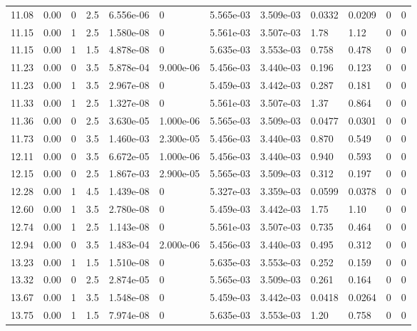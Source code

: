 \documentclass[preview]{standalone}
\begin{document}
{{{\begin{tabular}{L{1.2cm}C{1.2cm} C{0.3cm}C{0.5cm} C{1.4cm}C{1.4cm} C{1.4cm}C{1.4cm} C{1.6cm}C{1.6cm} C{1.6cm}C{1.6cm}}
  11.08  &  0.00  & 0     & 2.5 &  6.556e-06  & 0  &  5.565e-03&   3.509e-03& 0.0332 & 0.0209   &  0 & 0  \\ 
  11.15  &  0.00  & 1     & 2.5 &  1.580e-08  & 0  &  5.561e-03&   3.507e-03& 1.78 & 1.12   &  0 & 0  \\ 
  11.15  &  0.00  & 1     & 1.5 &  4.878e-08  & 0  &  5.635e-03&   3.553e-03& 0.758 & 0.478   &  0 & 0  \\ 
  11.23  &  0.00  & 0     & 3.5 &  5.878e-04  & 9.000e-06  &  5.456e-03&   3.440e-03& 0.196 & 0.123   &  0 & 0  \\ 
  11.23  &  0.00  & 1     & 3.5 &  2.967e-08  & 0  &  5.459e-03&   3.442e-03& 0.287 & 0.181   &  0 & 0  \\ 
  11.33  &  0.00  & 1     & 2.5 &  1.327e-08  & 0  &  5.561e-03&   3.507e-03& 1.37 & 0.864   &  0 & 0  \\ 
  11.36  &  0.00  & 0     & 2.5 &  3.630e-05  & 1.000e-06  &  5.565e-03&   3.509e-03& 0.0477 & 0.0301   &  0 & 0  \\ 
  11.73  &  0.00  & 0     & 3.5 &  1.460e-03  & 2.300e-05  &  5.456e-03&   3.440e-03& 0.870 & 0.549   &  0 & 0  \\ 
  12.11  &  0.00  & 0     & 3.5 &  6.672e-05  & 1.000e-06  &  5.456e-03&   3.440e-03& 0.940 & 0.593   &  0 & 0  \\ 
  12.15  &  0.00  & 0     & 2.5 &  1.867e-03  & 2.900e-05  &  5.565e-03&   3.509e-03& 0.312 & 0.197   &  0 & 0  \\ 
  12.28  &  0.00  & 1     & 4.5 &  1.439e-08  & 0  &  5.327e-03&   3.359e-03& 0.0599 & 0.0378   &  0 & 0  \\ 
  12.60  &  0.00  & 1     & 3.5 &  2.780e-08  & 0  &  5.459e-03&   3.442e-03& 1.75 & 1.10   &  0 & 0  \\ 
  12.74  &  0.00  & 1     & 2.5 &  1.143e-08  & 0  &  5.561e-03&   3.507e-03& 0.735 & 0.464   &  0 & 0  \\ 
  12.94  &  0.00  & 0     & 3.5 &  1.483e-04  & 2.000e-06  &  5.456e-03&   3.440e-03& 0.495 & 0.312   &  0 & 0  \\ 
  13.23  &  0.00  & 1     & 1.5 &  1.510e-08  & 0  &  5.635e-03&   3.553e-03& 0.252 & 0.159   &  0 & 0  \\ 
  13.32  &  0.00  & 0     & 2.5 &  2.874e-05  & 0  &  5.565e-03&   3.509e-03& 0.261 & 0.164   &  0 & 0  \\ 
  13.67  &  0.00  & 1     & 3.5 &  1.548e-08  & 0  &  5.459e-03&   3.442e-03& 0.0418 & 0.0264   &  0 & 0  \\ 
  13.75  &  0.00  & 1     & 1.5 &  7.974e-08  & 0  &  5.635e-03&   3.553e-03& 1.20 & 0.758   &  0 & 0  \\ 

\end{tabular}}}}
\end{document}
